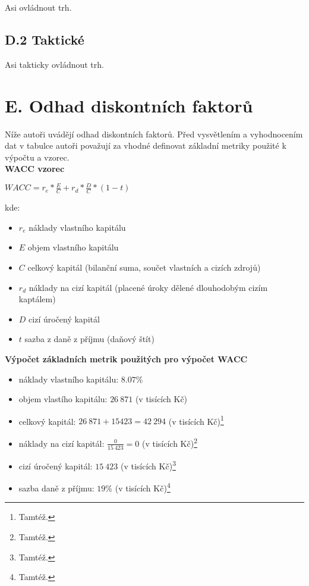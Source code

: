 Asi ovládnout trh.

\subsection*{D.2 Taktické}
\label{sec:Takticke}

Asi takticky ovládnout trh.

\newpage

\section*{E. Odhad diskontních faktorů}
\label{sec:Odhad diskontnich faktoru}

Níže autoři uvádějí odhad diskontních faktorů. Před vysvětlením a vyhodnocením dat v tabulce autoři považují za vhodné definovat základní metriky použité k výpočtu a vzorec.\\

\noindent\textbf{WACC vzorec}\\

\begin{center}
$WACC = r_e * \frac{E}{C} + r_d * \frac{D}{C} * (1 - t)$\\
\end{center}

kde:\\

\begin{itemize}
	\item $r_e$ náklady vlastního kapitálu
	\item $E$ objem vlastního kapitálu
	\item $C$ celkový kapitál (bilanční suma, součet vlastních a cizích zdrojů)
	\item $r_d$ náklady na cizí kapitál (placené úroky dělené dlouhodobým cizím kaptálem)
	\item $D$ cizí úročený kapitál
	\item $t$ sazba z daně z příjmu (daňový štít)
\end{itemize}

\noindent\textbf{Výpočet základních metrik použitých pro výpočet WACC}

\begin{itemize}
	\item náklady vlastního kapitálu: $8.07\%$%
	\item objem vlastího kapitálu: $26\ 871$ (v tisících Kč)
	\item celkový kapitál: $26\ 871 + 15 423 = 42\ 294$ (v tisících Kč)\footnote{Tamtéž.}
	\item náklady na cizí kapitál: $\frac{0}{15\ 423} = 0$ (v tisících Kč)\footnote{Tamtéž.}
	\item cizí úročený kapitál: $15\ 423$ (v tisících Kč)\footnote{Tamtéž.}
	\item sazba daně z příjmu: $19\%$ (v tisících Kč)\footnote{Tamtéž.}
\end{itemize}

